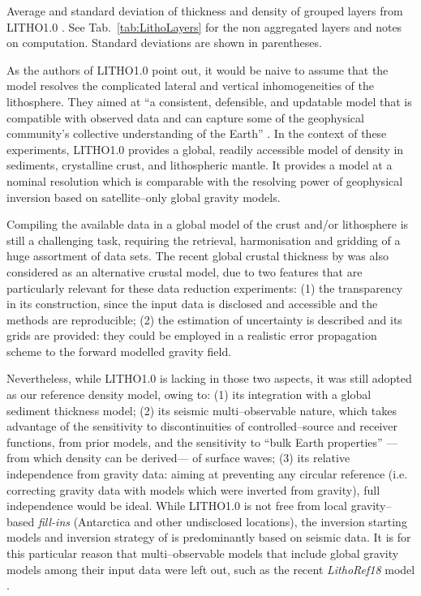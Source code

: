 \begin{table}
    \caption[Thickness and density of grouped layers from {LITHO1.0}.]{
        Average and standard deviation of thickness and density of grouped layers from {LITHO1.0} \parencite{Pasyanos2014}. See Tab.~\ref{tab:LithoLayers} for the non aggregated layers and notes on computation. Standard deviations are shown in parentheses.
    }
    \begin{adjustbox}{center}
        
    \end{adjustbox}
    \label{tab:LithoLayersGroups}
\end{table}

As the authors of {LITHO1.0} point out, it would be naive to assume that the model resolves the complicated lateral and vertical inhomogeneities of the lithosphere.
They aimed at ``a consistent, defensible, and updatable model that is compatible with observed data and can capture some of the geophysical community's collective understanding of the Earth'' \parencite{Pasyanos2014}.
In the context of these experiments, {LITHO1.0} provides a global, readily accessible model of density in sediments, crystalline crust, and lithospheric mantle.
It provides a model at a nominal resolution which is comparable with the resolving power of geophysical inversion based on satellite--only global gravity models.

Compiling the available data in a global model of the crust and/or lithosphere is still a challenging task, requiring the retrieval, harmonisation and gridding of a huge assortment of data sets.
The recent global crustal thickness by \textcite{Szwillus2019} was also considered as an alternative crustal model, due to two features that are particularly relevant for these data reduction experiments:
(1) the transparency in its construction, since the input data is disclosed and accessible \parencite{Mooney2015_globalcrust} and the methods are reproducible;
(2) the estimation of uncertainty is described and its grids are provided: they could be employed in a realistic error propagation scheme to the forward modelled gravity field.

Nevertheless, while {LITHO1.0} is lacking in those two aspects, it was still adopted as our reference density model, owing to:
(1) its integration with a global sediment thickness model;
(2) its seismic multi--observable nature, which takes advantage of the sensitivity to discontinuities of controlled--source and receiver functions, from prior models, and the sensitivity to ``bulk Earth properties'' ---from which density can be derived--- of surface waves;
(3) its relative independence from gravity data: aiming at preventing any circular reference (i.e. correcting gravity data with models which were inverted from gravity), full independence would be ideal. While {LITHO1.0} is not free from local gravity--based \textit{fill-ins} (Antarctica and other undisclosed locations), the inversion starting models and inversion strategy of \textcite{Pasyanos2014} is predominantly based on seismic data.
It is for this particular reason that multi--observable models that include global gravity models among their input data were left out, such as the recent \textit{LithoRef18} model \parencite{Afonso2019}.

